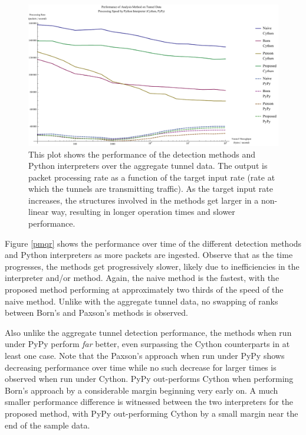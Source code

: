 \documentclass[12pt]{report}
\theoremstyle{remark}
\theoremstyle{definition}
\theoremstyle{definition}
\theoremstyle{definition}
\begin{document}
\begin{figure}
\centering
\includegraphics[width=\textwidth]{figures/pmat.pdf}
\caption[Performance of Analysis Method and Python Interpreter on Aggregate
Tunnel Data]{This plot shows the performance of the detection methods and Python
interpreters over the aggregate tunnel data. The output is packet processing
rate as a function of the target input rate (rate at which the tunnels are
transmitting traffic). As the target input rate increases, the structures
involved in the methods get larger in a non-linear way, resulting in longer
operation times and slower performance.}
\label{pmat}
\end{figure}

Figure \ref{pmqr} shows the performance over time of the different detection
methods and Python interpreters as more packets are ingested. Observe that as
the time progresses, the methods get progressively slower, likely due to
inefficiencies in the interpreter and/or method. Again, the naive method is the
fastest, with the proposed method performing at approximately two thirds of the
speed of the naive method. Unlike with the aggregate tunnel data, no swapping of ranks between
Born's and Paxson's methods is observed.

Also unlike the aggregate tunnel detection performance, the methods when run
under PyPy perform \emph{far} better, even surpassing the Cython counterparts in
at least one case. Note that the Paxson's approach when run under PyPy shows
decreasing performance over time while no such decrease for larger times is
observed when run under Cython. PyPy out-performs Cython when performing Born's
approach by a considerable margin beginning very early on. A much smaller
performance difference is witnessed between the two interpreters for the
proposed method, with PyPy out-performing Cython by a small margin near the end
of the sample data.
\end{document}
